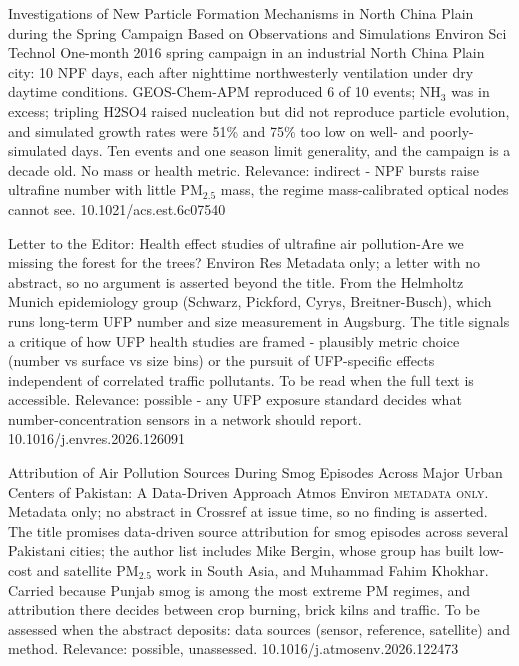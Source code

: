 \documentclass[10pt]{article}
\begin{document}
{Investigations of New Particle Formation Mechanisms in North China Plain during the Spring Campaign Based on Observations and Simulations}
{Environ Sci Technol}
{One-month 2016 spring campaign in an industrial North China Plain city: 10 NPF days, each after nighttime northwesterly ventilation under dry daytime conditions. GEOS-Chem-APM reproduced 6 of 10 events; NH$_3$ was in excess; tripling H2SO4 raised nucleation but did not reproduce particle evolution, and simulated growth rates were 51\% and 75\% too low on well- and poorly-simulated days. Ten events and one season limit generality, and the campaign is a decade old. No mass or health metric. Relevance: indirect - NPF bursts raise ultrafine number with little PM$_{2.5}$ mass, the regime mass-calibrated optical nodes cannot see.}
{10.1021/acs.est.6c07540}

{Letter to the Editor: Health effect studies of ultrafine air pollution-Are we missing the forest for the trees?}
{Environ Res}
{Metadata only; a letter with no abstract, so no argument is asserted beyond the title. From the Helmholtz Munich epidemiology group (Schwarz, Pickford, Cyrys, Breitner-Busch), which runs long-term UFP number and size measurement in Augsburg. The title signals a critique of how UFP health studies are framed - plausibly metric choice (number vs surface vs size bins) or the pursuit of UFP-specific effects independent of correlated traffic pollutants. To be read when the full text is accessible. Relevance: possible - any UFP exposure standard decides what number-concentration sensors in a network should report.}
{10.1016/j.envres.2026.126091}

{Attribution of Air Pollution Sources During Smog Episodes Across Major Urban Centers of Pakistan: A Data-Driven Approach}
{Atmos Environ}
{\textsc{metadata only.} Metadata only; no abstract in Crossref at issue time, so no finding is asserted. The title promises data-driven source attribution for smog episodes across several Pakistani cities; the author list includes Mike Bergin, whose group has built low-cost and satellite PM$_{2.5}$ work in South Asia, and Muhammad Fahim Khokhar. Carried because Punjab smog is among the most extreme PM regimes, and attribution there decides between crop burning, brick kilns and traffic. To be assessed when the abstract deposits: data sources (sensor, reference, satellite) and method. Relevance: possible, unassessed.}
{10.1016/j.atmosenv.2026.122473}
\end{document}
